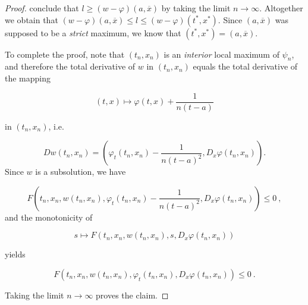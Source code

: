 \begin{lemma}
\begin{proof}
				conclude that $ l \geq (w- \varphi)(a, \overline{x}) $ by taking the limit $ n \to \infty $. Altogether we obtain that $ (w - \varphi)(a, \overline{x}) \leq l \leq (w - \varphi)(t^{*}, x^{*}) $. Since $ (a, \overline{x}) $ was supposed to be a \emph{strict} maximum, we know that $ (t^{*}, x^{*}) = (a, \overline{x}) $.
				
				To complete the proof, note that $ (t_n, x_n) $ is an \emph{interior} local maximum of $ \psi_n $, and therefore the total derivative of $ w $ in $ (t_n, x_n) $ equals the total derivative of the mapping 
				
				\begin{equation*}
					(t, x) \mapsto \varphi(t, x) + \frac{1}{n(t-a)}
				\end{equation*}
				
				in $ (t_n, x_n) $, i.e.
				
				\begin{equation*}
					Dw(t_n, x_n) = \left( \varphi_t(t_n, x_n) - \frac{1}{n(t-a)^2}, D_x \varphi(t_n, x_n) \right) .
				\end{equation*}
				Since $ w $ is a subsolution, we have
				
				\begin{equation*}
					F \left(t_n, x_n, w(t_n, x_n), \varphi_t(t_n, x_n) - \frac{1}{n(t-a)^2}, D_x \varphi(t_n, x_n) \right) \leq 0 \ ,
				\end{equation*}
				and the monotonicity of
				
				\begin{equation*}
					s \mapsto F( t_n, x_n, w(t_n, x_n), s, D_x \varphi(t_n, x_n ) )
				\end{equation*}
				
				yields 
				
				\begin{equation*}
					F(t_n, x_n, w(t_n, x_n), \varphi_t(t_n, x_n), D_x \varphi(t_n, x_n) ) \leq 0 \ .
				\end{equation*}
				
				Taking the limit $ n \to \infty $  proves the claim.
			\end{proof}
		\end{lemma}